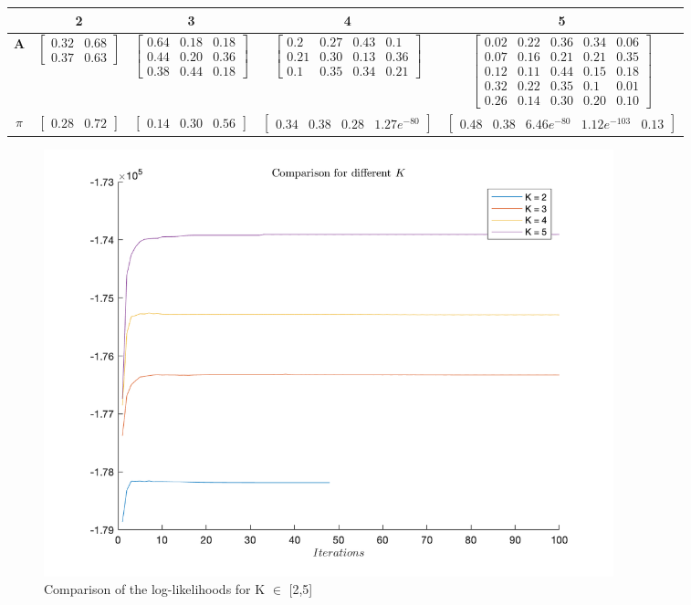 \documentclass[12pt]{article}
\begin{document}
\begin{table}[]
	\hskip-1.7cm
	\begin{tabular}{|c|c|c|c|c|}
		\hline
		& 2 & 3 & 4 & 5 \\ \hline \hline
		$\mathbf{A}$     & $\begin{bmatrix}0.32 & 0.68\\0.37 & 0.63 \end{bmatrix} $ &  $\begin{bmatrix}0.64 & 0.18 & 0.18\\0.44 & 0.20 & 0.36\\0.38 & 0.44 & 0.18 \end{bmatrix}$  &$ \begin{bmatrix}0.2 & 0.27 & 0.43 & 0.1\\0.21 & 0.30 & 0.13 & 0.36\\0.1 & 0.35 & 0.34 & 0.21\end{bmatrix}  $  & $\begin{bmatrix}0.02 & 0.22 & 0.36 & 0.34 & 0.06\\0.07 & 0.16 & 0.21 & 0.21 & 0.35\\0.12 & 0.11 & 0.44 & 0.15 & 0.18\\0.32 & 0.22 & 0.35 & 0.1 & 0.01\\0.26 & 0.14 & 0.30 & 0.20 & 0.10 \end{bmatrix}   $ \\ \hline
		$\pi$ & $\begin{bmatrix}0.28 & 0.72\end{bmatrix} $  & $\begin{bmatrix}0.14 & 0.30 & 0.56\end{bmatrix} $  & $\begin{bmatrix}0.34 & 0.38 & 0.28 & 1.27e^{-80}\end{bmatrix} $   & $\begin{bmatrix}0.48 & 0.38 & 6.46e^{-80} & 1.12e^{-103} & 0.13\end{bmatrix} $  \\ \hline
	\end{tabular}
\end{table}


\begin{figure}[h]
	\centering
	\includegraphics[width=0.8\textwidth]{images/ll_comparison.png}
	\caption{Comparison of the log-likelihoods for K $\in$ [2,5]}
	\label{fig:ll_comparison}
\end{figure}
\end{document}
